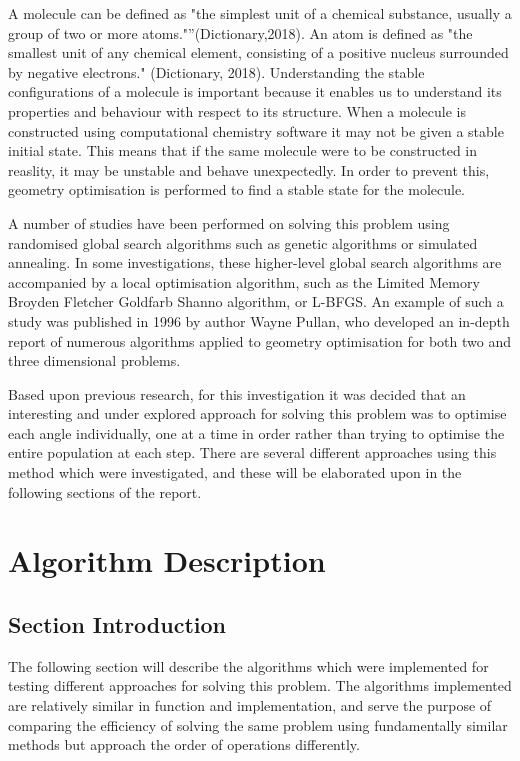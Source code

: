 \documentclass[conference]{IEEEtran}
\begin{document}
A molecule can be defined as "the simplest unit of a chemical substance, usually a group 
of two or more atoms."”(Dictionary,2018). An atom is defined as "the smallest unit of any 
chemical element, consisting of a positive nucleus surrounded by negative electrons."
(Dictionary, 2018). Understanding the stable configurations of a molecule is important 
because it enables us to understand its properties and behaviour with respect to its
structure. When a molecule is constructed using computational chemistry software it may not
be given a stable initial state. This means that if the same molecule were to be constructed
in reaslity, it may be unstable and behave unexpectedly. In order to prevent this, geometry
optimisation is performed to find a stable state for the molecule.

A number of studies have been performed on solving this problem using randomised global search
algorithms such as genetic algorithms or simulated annealing. In some investigations, these
higher-level global search algorithms are accompanied by a local optimisation algorithm, such
as the Limited Memory Broyden Fletcher Goldfarb Shanno algorithm, or L-BFGS. An example of such
a study was published in 1996 by author Wayne Pullan, who developed an in-depth report of numerous
algorithms applied to geometry optimisation for both two and three dimensional problems. 

Based upon previous research, for this investigation it was decided that an interesting and
under explored approach for solving this problem was to optimise each angle individually, one at 
a time in order rather than trying to optimise the entire population at each step. There are several
different approaches using this method which were investigated, and these will be elaborated upon
in the following sections of the report.

\section{Algorithm Description}
\subsection{Section Introduction}

The following section will describe the algorithms which were implemented for testing different
approaches for solving this problem. The algorithms implemented are relatively similar in function
and implementation, and serve the purpose of comparing the efficiency of solving the same problem 
using fundamentally similar methods but approach the order of operations differently.
\end{document}
